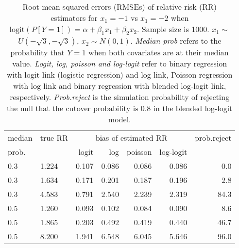 \documentclass[12pt,a4paper]{article}
\begin{document}
\begin{table}[H] 
\small\sf\centering 
\caption{Root mean squared errors (RMSEs) of relative risk (RR) estimators for $x_1=-1$ vs $x_1=-2$ when $\mbox{logit}(P[Y=1])=\alpha+\beta_1 x_1 + \beta_2 x_2$. Sample size is 1000. $x_1 \sim $$U(-\sqrt{3},-\sqrt{3})$, $x_2 \sim N(0,1)$. {\it Median prob} refers to the probability that $Y=1$ when both covariates are at their median value. {\it Logit, log, poisson and log-logit} refer to binary regression with logit link (logistic regression) and log link, Poisson regression with log link and binary regression with blended log-logit link, respectively. {\it Prob.reject} is the simulation probability of rejecting the null that the cutover probability is $0.8$ in the blended log-logit model.} 
\begin{tabular}{llrrrrr} 
\toprule 
median & true RR & \multicolumn{4}{c}{bias of estimated RR} & prob.reject \\ 
prob. & & logit & log & poisson & log-logit  & \\ \midrule 
0.3 & 1.224 & 0.107 & 0.086 & 0.086 & 0.086 &  0.0 \\  
0.3 & 1.634 & 0.171 & 0.201 & 0.187 & 0.196 &  2.8 \\  
0.3 & 4.583 & 0.791 & 2.540 & 2.239 & 2.319 & 84.3 \\  
0.5 & 1.260 & 0.093 & 0.102 & 0.084 & 0.090 &  8.6 \\  
0.5 & 1.865 & 0.203 & 0.492 & 0.419 & 0.440 & 46.7 \\  
0.5 & 8.200 & 1.941 & 6.548 & 6.045 & 5.646 & 96.0 \\  
\bottomrule 
\end{tabular} 
\end{table} 
\end{document}
